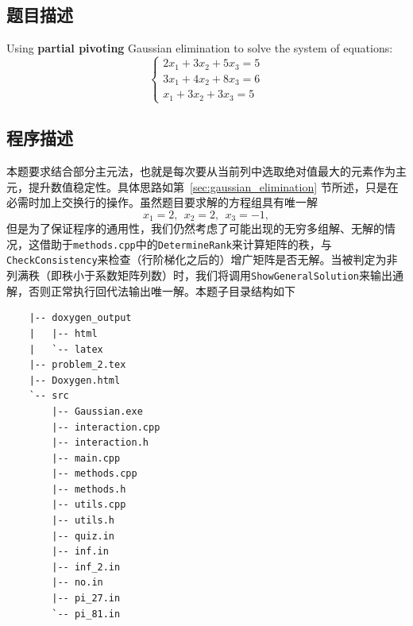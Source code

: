 \subsection{题目描述}
Using \textbf{partial pivoting} Gaussian elimination to solve the system of equations:
\[
	\begin{cases}
		2x_1 + 3x_2 + 5x_3 = 5 \\
		3x_1 + 4x_2 + 8x_3 = 6 \\
		x_1 + 3x_2 + 3x_3 = 5
	\end{cases}
\]

\subsection{程序描述}
本题要求结合部分主元法，也就是每次要从当前列中选取绝对值最大的元素作为主元，提升数值稳定性。具体思路如第\ \ref{sec:gaussian_elimination} 节所述，只是在必需时加上交换行的操作。虽然题目要求解的方程组具有唯一解
\[
	x_1 = 2, \ \  x_2 = 2,  \ \   x_3 = -1,
\]
但是为了保证程序的通用性，我们仍然考虑了可能出现的无穷多组解、无解的情况，这借助于\texttt{methods.cpp}中的\texttt{DetermineRank}来计算矩阵的秩，与\texttt{CheckConsistency}来检查（行阶梯化之后的）增广矩阵是否无解。当被判定为非列满秩（即秩小于系数矩阵列数）时，我们将调用\texttt{ShowGeneralSolution}来输出通解，否则正常执行回代法输出唯一解。本题子目录结构如下
\begin{multicols}{2}
	\begin{verbatim}
    |-- doxygen_output
    |   |-- html
    |   `-- latex
    |-- problem_2.tex
    |-- Doxygen.html
    `-- src
        |-- Gaussian.exe
        |-- interaction.cpp
        |-- interaction.h
        |-- main.cpp
        |-- methods.cpp
        |-- methods.h
        |-- utils.cpp
        |-- utils.h
        |-- quiz.in
        |-- inf.in
        |-- inf_2.in
        |-- no.in
        |-- pi_27.in
        `-- pi_81.in
    \end{verbatim}
\end{multicols}
